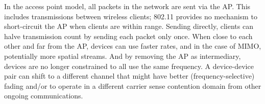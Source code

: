 In the access point model, all packets in the network are sent via the AP\@. This includes transmissions between wireless clients; 802.11 provides no mechanism to short-circuit the AP when clients are within range. Sending directly, clients can halve transmission count by sending each packet only once. When close to each other and far from the AP, devices can use faster rates, and in the case of MIMO, potentially more spatial streams. And by removing the AP as intermediary, devices are no longer constrained to all use the same frequency. A device-device pair can shift to a different channel that might have better (frequency-selective) fading and/or to operate in a different carrier sense contention domain from other ongoing communications.







